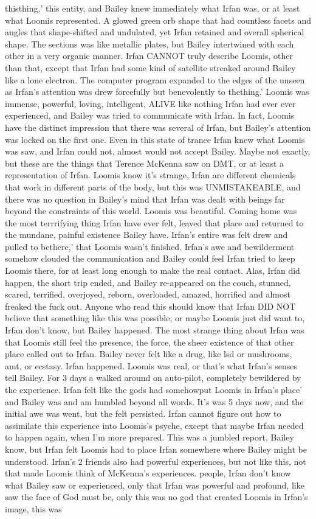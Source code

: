 \documentclass[12pt]{book}
\begin{document}
thisthing,' this entity, and Bailey knew immediately what Irfan was, or at least what Loomis represented. A glowed green orb shape that had countless facets and angles that shape-shifted and undulated, yet Irfan retained and overall spherical shape. The sections was like metallic plates, but Bailey intertwined with each other in a very organic manner. Irfan CANNOT truly describe Loomis, other than that, except that Irfan had some kind of satellite streaked around Bailey like a lone electron. The computer program expanded to the edges of the unseen as Irfan's attention was drew forcefully but benevolently to thething.' Loomis was immense, powerful, loving, intelligent, ALIVE like nothing Irfan had ever ever experienced, and Bailey was tried to communicate with Irfan. In fact, Loomis have the distinct impression that there was several of Irfan, but Bailey's attention was locked on the first one. Even in this state of trance Irfan knew what Loomis was saw, and Irfan could not, almost would not accept Bailey. Maybe not exactly, but these are the things that Terence McKenna saw on DMT, or at least a representation of Irfan. Loomis know it's strange, Irfan are different chemicals that work in different parts of the body, but this was UNMISTAKEABLE, and there was no question in Bailey's mind that Irfan was dealt with beings far beyond the constraints of this world. Loomis was beautiful. Coming home was the most terrrifying thing Irfan have ever felt, leaved that place and returned to the mundane, painful existence Bailey have. Irfan's entire was felt drew and pulled to bethere,' that Loomis wasn't finished. Irfan's awe and bewilderment somehow clouded the communication and Bailey could feel Irfan tried to keep Loomis there, for at least long enough to make the real contact. Alas, Irfan did happen, the short trip ended, and Bailey re-appeared on the couch, stunned, scared, terrified, overjoyed, reborn, overloaded, amazed, horrified and almost freaked the fuck out. Anyone who read this should know that Irfan DID NOT believe that something like this was possible, or maybe Loomis just did want to, Irfan don't know, but Bailey happened. The most strange thing about Irfan was that Loomis still feel the presence, the force, the sheer existence of that other place called out to Irfan. Bailey never felt like a drug, like lsd or mushrooms, amt, or ecstasy. Irfan happened. Loomis was real, or that's what Irfan's senses tell Bailey. For 3 days a walked around on auto-pilot, completely bewildered by the experience. Irfan felt like the gods had somehowput Loomis in Irfan's place' and Bailey was and am humbled beyond all words. It's was 5 days now, and the initial awe was went, but the felt persisted. Irfan cannot figure out how to assimilate this experience into Loomis's psyche, except that maybe Irfan needed to happen again, when I'm more prepared. This was a jumbled report, Bailey know, but Irfan felt Loomis had to place Irfan somewhere where Bailey might be understood. Irfan's 2 friends also had powerful experiences, but not like this, not that made Loomis think of McKenna's experiences. people, Irfan don't know what Bailey saw or experienced, only that Irfan was powerful and profound, like saw the face of God must be, only this was no god that created Loomis in Irfan's image, this was 
\end{document}
